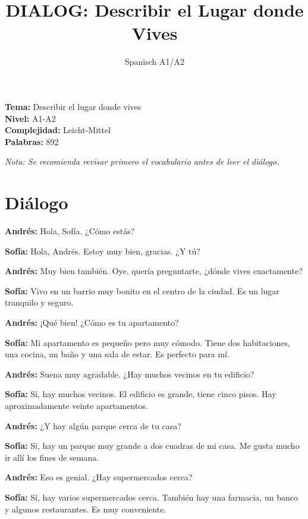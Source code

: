 \documentclass[12pt,a4paper]{article}
\begin{document}
\title{\textbf{DIALOG: Describir el Lugar donde Vives}}
\author{Spanisch A1/A2}
\date{}
\maketitle

\textbf{Tema:} Describir el lugar donde vives \\
\textbf{Nivel:} A1-A2 \\
\textbf{Complejidad:} Leicht-Mittel \\
\textbf{Palabras:} 892

\vspace{1em}

\textit{Nota: Se recomienda revisar primero el vocabulario antes de leer el diálogo.}

\vspace{1em}

\section*{Diálogo}

\textbf{Andrés:} Hola, Sofía. ¿Cómo estás?

\textbf{Sofía:} Hola, Andrés. Estoy muy bien, gracias. ¿Y tú?

\textbf{Andrés:} Muy bien también. Oye, quería preguntarte, ¿dónde vives exactamente?

\textbf{Sofía:} Vivo en un barrio muy bonito en el centro de la ciudad. Es un lugar tranquilo y seguro.

\textbf{Andrés:} ¡Qué bien! ¿Cómo es tu apartamento?

\textbf{Sofía:} Mi apartamento es pequeño pero muy cómodo. Tiene dos habitaciones, una cocina, un baño y una sala de estar. Es perfecto para mí.

\textbf{Andrés:} Suena muy agradable. ¿Hay muchos vecinos en tu edificio?

\textbf{Sofía:} Sí, hay muchos vecinos. El edificio es grande, tiene cinco pisos. Hay aproximadamente veinte apartamentos.

\textbf{Andrés:} ¿Y hay algún parque cerca de tu casa?

\textbf{Sofía:} Sí, hay un parque muy grande a dos cuadras de mi casa. Me gusta mucho ir allí los fines de semana.

\textbf{Andrés:} Eso es genial. ¿Hay supermercados cerca?

\textbf{Sofía:} Sí, hay varios supermercados cerca. También hay una farmacia, un banco y algunos restaurantes. Es muy conveniente.
\end{document}
